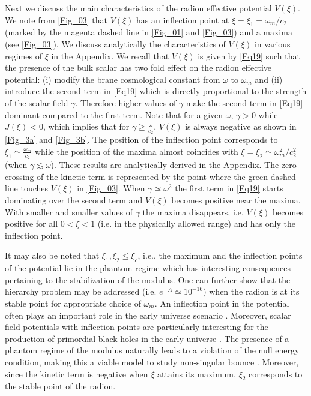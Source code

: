 \documentclass{article}
\begin{document}



Next we discuss the main characteristics of the radion effective potential $V(\xi)$. We note from \ref{Fig_03} that $V(\xi)$ has an inflection point at $\xi=\xi_1={\omega_m/c_2}$ (marked by the magenta dashed line in \ref{Fig_01} and \ref{Fig_03}) and a maxima (see \ref{Fig_03}).
We discuss analytically the characteristics of $V(\xi)$ in various regimes of $\xi$ in the Appendix.
We recall that $V(\xi)$ is given by \ref{Eq19} such that the presence of the bulk scalar has two fold effect on the radion effective potential: 
(i) modify the brane cosmological constant from $\omega$ to $\omega_m$ and (ii) introduce the second term in \ref{Eq19} which is directly 
proportional to the strength of the scalar field $\gamma$. Therefore higher values of $\gamma$ make the second term in \ref{Eq19} 
dominant compared to the first term. Note that for a given $\omega$, $\gamma>0$ while $J(\xi)<0$, which implies that for 
$\gamma\geq \frac{\omega}{c_2}$, $V(\xi)$ is always negative as shown in \ref{Fig_3a} and \ref{Fig_3b}. 
The position of the inflection point corresponds to $\xi_1\simeq \frac{\omega_m}{c_2}$ while the position of the maxima almost coincides with $\xi= \xi_2\simeq \omega_m^2/c_2^2$ (when $\gamma\lesssim \omega$). These results are analytically derived in the Appendix. The zero crossing of the kinetic term  is represented by the point where the green dashed line touches $V(\xi)$ in \ref{Fig_03}. 
When $\gamma\simeq \omega^2$ the first term in \ref{Eq19} starts dominating over the second term and $V(\xi)$ becomes positive near the maxima. With smaller and smaller values of $\gamma$ the maxima disappears, i.e. $V(\xi)$ becomes positive for all $0<\xi<1$ (i.e. in the physically allowed range) and has only the inflection point. 




It may also be noted that $\xi_1,\xi_2 \leq \xi_c$, i.e., the maximum 
and the inflection points of the potential lie in the phantom regime which has interesting consequences pertaining to the stabilization of the modulus. One can further show that the hierarchy problem may be addressed (i.e. $e^{-A}\simeq 10^{-16}$) when the radion is at its stable point for appropriate choice of $\omega_m$.
An inflection point in the potential often plays an important role in the early universe scenario 
\cite{Okada:2017cvy,Okada:2016ssd,Dimopoulos:2017xox,Baumann:2007np,Baumann:2007ah,Allahverdi:2006iq,Allahverdi:2006we,BuenoSanchez:2006rze}. 
Moreover, scalar field potentials with inflection points are particularly interesting for the production of primordial 
black holes in the early universe \cite{Braglia:2020eai}.  
The presence of a phantom regime of the modulus naturally leads to a violation of the null energy condition, making this a viable 
model to study non-singular bounce \cite{Banerjee:2020uil}.
Moreover, since the kinetic term is negative when $\xi$ attains its maximum, $\xi_2$ corresponds to the stable point of the radion.
\end{document}
